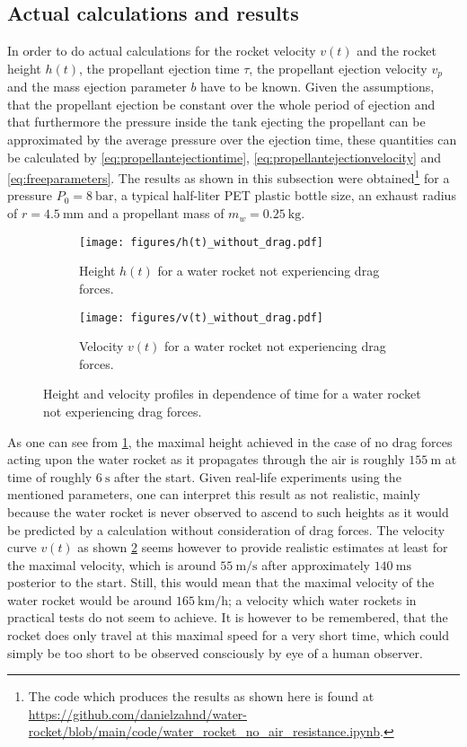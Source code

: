 \documentclass[a4paper,11pt]{report}
\begin{document}
\subsection{Actual calculations and results}
In order to do actual calculations for the rocket velocity $v(t)$ and the rocket height $h(t)$, the propellant ejection time $\tau$, the propellant ejection  velocity $v_p$ and the mass ejection parameter $b$ have to be known. Given the assumptions, that the propellant ejection be constant over the whole period of ejection and that furthermore the pressure inside the tank ejecting the propellant can be approximated by the average pressure over the ejection time, these quantities can be calculated by \cref{eq:propellantejectiontime}, \cref{eq:propellantejectionvelocity} and \cref{eq:freeparameters}. The results as shown in this subsection were obtained\footnote{The code which produces the results as shown here is found at \url{https://github.com/danielzahnd/water-rocket/blob/main/code/water_rocket_no_air_resistance.ipynb}.} for a pressure $P_0 = \SI{8}{\bar}$, a typical half-liter PET plastic bottle size, an exhaust radius of $r = \SI{4.5}{\milli\meter}$ and a propellant mass of $m_w = \SI{0.25}{\kilo\gram}$.
\begin{figure}[h]
	\begin{subfigure}{0.49\textwidth}
		\centering
		\texttt{[image: figures/h(t)\_without\_drag.pdf]}
		\caption{Height $h(t)$ for a water rocket not experiencing drag forces.}
		\label{fig:h(t)_without_drag}
	\end{subfigure} \hfill
	\begin{subfigure}{0.49\textwidth}
		\centering
		\texttt{[image: figures/v(t)\_without\_drag.pdf]}
		\caption{Velocity $v(t)$ for a water rocket not experiencing drag forces.}
		\label{fig:v(t)_without_drag}
	\end{subfigure}
	\caption{Height and velocity profiles in dependence of time for a water rocket not experiencing drag forces.}
	\label{fig:results1_without_drag}
\end{figure}

As one can see from \cref{fig:h(t)_without_drag}, the maximal height achieved in the case of no drag forces acting upon the water rocket as it propagates through the air is roughly $\SI{155}{\meter}$ at time of roughly $\SI{6}{\second}$ after the start. Given real-life experiments using the mentioned parameters, one can interpret this result as not realistic, mainly because the water rocket is never observed to ascend to such heights as it would be predicted by a calculation without consideration of drag forces. The velocity curve $v(t)$ as shown \cref{fig:v(t)_without_drag} seems however to provide realistic estimates at least for the maximal velocity, which is around $\SI{55}{\meter\per\second}$ after approximately $\SI{140}{\milli\second}$ posterior to the start. Still, this would mean that the maximal velocity of the water rocket would be around $\SI{165}{\kilo\meter\per\hour}$; a velocity which water rockets in practical tests do not seem to achieve. It is however to be remembered, that the rocket does only travel at this maximal speed for a very short time, which could simply be too short to be observed consciously by eye of a human observer.
\end{document}
